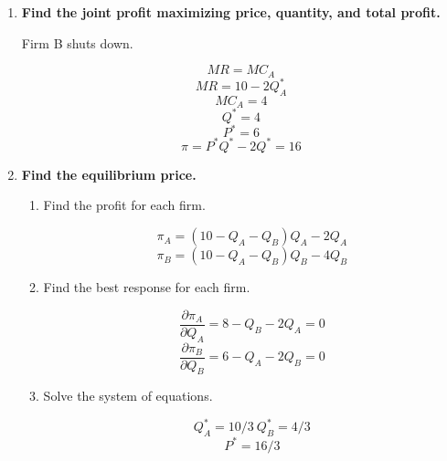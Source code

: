 \documentclass{article}
\begin{document}
\begin{enumerate}
    \item \textbf{Find the joint profit maximizing price, quantity, and total profit.}
    
    Firm B shuts down.
    
    $$MR=MC_{A}$$
    $$MR=10-2Q_{A}^{*}$$
    $$MC_{A}=4$$
    $$Q^{*}=4$$
    $$P^{*}=6$$
    $$\pi=P^{*}Q^{*}-2Q^{*}=16$$
    
    \item \textbf{Find the equilibrium price.}
    
    \begin{enumerate}[i]
        \item Find the profit for each firm.
        
        $$\pi_{A}=(10-Q_{A}-Q_{B})Q_{A}-2Q_{A}$$
        $$\pi_{B}=(10-Q_{A}-Q_{B})Q_{B}-4Q_{B}$$
        
        \item Find the best response for each firm.
        
        $$\frac{\partial \pi_{A}}{\partial Q_{A}}=8-Q_{B}-2Q_{A}=0$$
        $$\frac{\partial \pi_{B}}{\partial Q_{B}}=6-Q_{A}-2Q_{B}=0$$
        
        \item Solve the system of equations.
        
        $$Q_{A}^{*}=10/3\ Q_{B}^{*}=4/3$$
        $$P^{*}=16/3$$
        
    \end{enumerate}
    
    
    
\end{enumerate}
\end{document}
